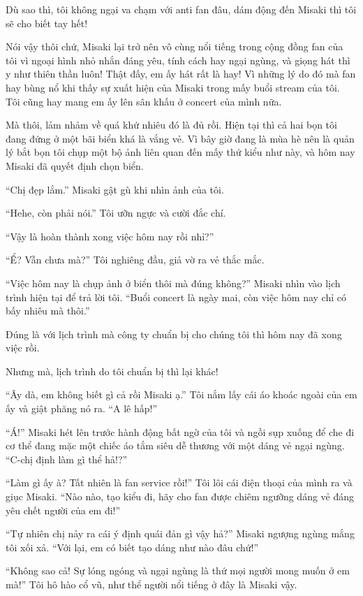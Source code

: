 {Dù sao thì, tôi không ngại va chạm với anti fan đâu, dám động đến Misaki
thì tôi sẽ cho biết tay hết!

Nói vậy thôi chứ, Misaki lại trở nên vô cùng nổi tiếng trong cộng đồng
fan của tôi vì ngoại hình nhỏ nhắn đáng yêu, tính cách hay ngại ngùng,
và giọng hát thì y như thiên thần luôn! Thật đấy, em ấy hát rất là hay!
Vì những lý do đó mà fan hay bùng nổ khi thấy sự xuất hiện của Misaki
trong mấy buổi stream của tôi. Tôi cũng hay mang em ấy lên sân khấu ở
concert của mình nữa.

Mà thôi, lảm nhảm về quá khứ nhiêu đó là đủ rồi. Hiện tại thì cả hai bọn
tôi đang đứng ở một bãi biển khá là vắng vẻ. Vì bây giờ đang là mùa hè
nên là quản lý bắt bọn tôi chụp một bộ ảnh liên quan đến mấy thứ kiểu
như này, và hôm nay Misaki đã quyết định chọn biển.

``Chị đẹp lắm.'' Misaki gật gù khi nhìn ảnh của tôi.

``Hehe, còn phải nói.'' Tôi ưỡn ngực và cười đắc chí.

``Vậy là hoàn thành xong việc hôm nay rồi nhỉ?''

``Ể? Vẫn chưa mà?'' Tôi nghiêng đầu, giả vờ ra vẻ thắc mắc.

``Việc hôm nay là chụp ảnh ở biển thôi mà đúng không?'' Misaki nhìn vào
lịch trình hiện tại để trả lời tôi. ``Buổi concert là ngày mai, còn việc
hôm nay chỉ có bấy nhiêu mà thôi.''

Đúng là với lịch trình mà công ty chuẩn bị cho chúng tôi thì hôm nay đã
xong việc rồi.

Nhưng mà, lịch trình do tôi chuẩn bị thì lại khác!

``Ây dà, em không biết gì cả rồi Misaki ạ.'' Tôi nắm lấy cái áo khoác
ngoài của em ấy và giật phăng nó ra. ``A lê hấp!''

``Á!'' Misaki hét lên trước hành động bất ngờ của tôi và ngồi sụp xuống
để che đi cơ thể đang mặc một chiếc áo tắm siêu dễ thương với một dáng
vẻ ngại ngùng. ``C-chị định làm gì thể hả!?''

``Làm gì ấy à? Tất nhiên là fan service rồi!'' Tôi lôi cái điện thoại
của mình ra và giục Misaki. ``Nào nào, tạo kiểu đi, hãy cho fan được
chiêm ngưỡng dáng vẻ đáng yêu chết người của em đi!''

``Tự nhiên chị nảy ra cái ý định quái đản gì vậy hả?'' Misaki ngượng
ngùng mắng tôi xối xả. ``Với lại, em có biết tạo dáng như nào đâu chứ!''

``Không sao cả! Sự lóng ngóng và ngại ngùng là thứ mọi người mong muốn ở
em mà!'' Tôi hô hào cổ vũ, như thể người nổi tiếng ở đây là Misaki vậy.

}
